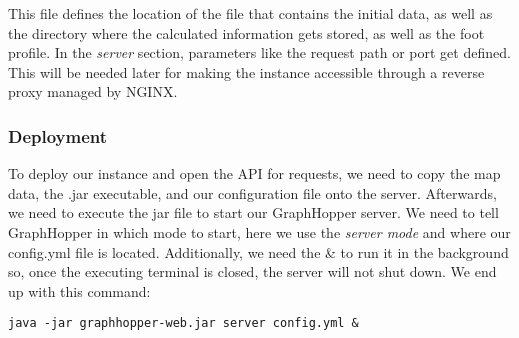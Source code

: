 This file defines the location of the file that contains the initial data, as well as the directory where the calculated information gets stored, as well as the foot profile. In the \textit{server} section, parameters like the request path or port get defined. This will be needed later for making the instance accessible through a reverse proxy managed by NGINX. 

\subsubsection{Deployment}
To deploy our instance and open the API for requests, we need to copy the map data, the .jar executable, and our configuration file onto the server. Afterwards, we need to execute the jar file to start our GraphHopper server. We need to tell GraphHopper in which mode to start, here we use the \textit{server mode} and where our config.yml file is located. Additionally, we need the \& to run it in the background so, once the executing terminal is closed, the server will not shut down. We end up with this command:


\begin{center}
  \texttt{java -jar graphhopper-web.jar server config.yml \&}
\end{center}
\newpage